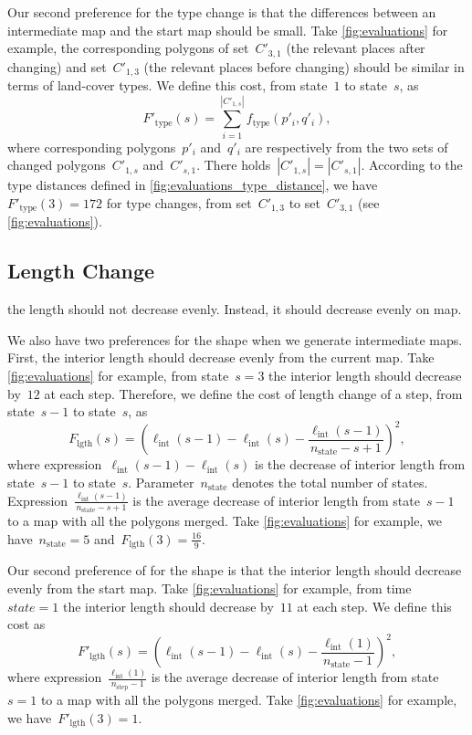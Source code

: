 \documentclass[ijgi,article,submit,moreauthors,pdftex]{Definitions/mdpi}
\begin{document}
Our second preference for the type change is that 
the differences between an intermediate map and the start map
should be small.
Take \fig\ref{fig:evaluations} for example, the corresponding polygons of
set~$C'_{3,1}$ (the relevant places after  changing) and 
set~$C'_{1,3}$ (the relevant places before changing)
should be similar in terms of land-cover types.
We define this cost, from state~$1$ to state~$s$, as
\begin{equation}
\label{eq:F_type_prime}
F'_\mathrm{type}(s)=\sum_{i=1}^{|C'_{1,s}|} f_\mathrm{type}(p'_i,q'_i),
\end{equation}
where corresponding polygons~$p'_i$ and~$q'_i$ are respectively from 
the two sets of changed polygons~$C'_{1,s}$ and~$C'_{s,1}$.
There holds~$|C'_{1,s}| = |C'_{s,1}|$.
According to the type distances defined in \fig\ref{fig:evaluations_type_distance},
we have~$F'_\mathrm{type}(3)=172$
for type changes, from set~$C'_{1,3}$ to set~$C'_{3,1}$
(see \fig\ref{fig:evaluations}).

\subsection{Length Change}

{\color{red}the length should not decrease evenly. 
Instead, it should decrease evenly on map.}

We also have two preferences for the shape when we generate intermediate maps.
First, the interior length should decrease evenly from the current map.
Take \fig\ref{fig:evaluations} for example, 
from state~$s=3$ the interior length should decrease by~$12$ at each step.
Therefore, we define the cost of length change of a step,
from state~$s-1$ to state~$s$, as
\begin{equation}
\label{eq:F_lgth}
F_\mathrm{lgth}(s)=
    \left(\ell_\mathrm{int}(s-1)-\ell_\mathrm{int}(s)-
        \frac{\ell_\mathrm{int}(s-1)}{n_\mathrm{state}-s+1}\right)^2,
\end{equation}
where expression~$\ell_\mathrm{int}(s-1)-\ell_\mathrm{int}(s)$ 
is the decrease of interior length from state~$s-1$ to state~$s$.
Parameter~$n_\mathrm{state}$ denotes the total number of states.
Expression~$\frac{\ell_\mathrm{int}(s-1)}{n_\mathrm{state}-s+1}$
is the average decrease of interior length from state~$s-1$ 
to a map with all the polygons merged.
Take \fig\ref{fig:evaluations} for example,
we have~$n_\mathrm{state}=5$ and~$F_\mathrm{lgth}(3)=\frac{16}{9}$.


Our second preference of for the shape is that
the interior length should decrease evenly from the start map. 
Take \fig\ref{fig:evaluations} for example, 
from time~$state=1$ the interior length should decrease by~$11$ at each step.
We define this cost as
\begin{equation}
\label{eq:F_lgth_prime}
F'_\mathrm{lgth}(s)=
\left(\ell_\mathrm{int}(s-1)-\ell_\mathrm{int}(s)-
        \frac{\ell_\mathrm{int}(1)}{n_\mathrm{state}-1}\right)^2,
\end{equation}
where expression~$\frac{\ell_\mathrm{int}(1)}{n_\mathrm{step}-1}$
is the average decrease of interior length from state~$s=1$ 
to a map with all the polygons merged.
Take \fig\ref{fig:evaluations} for example,
we have~$F'_\mathrm{lgth}(3)=1$.
\end{document}
